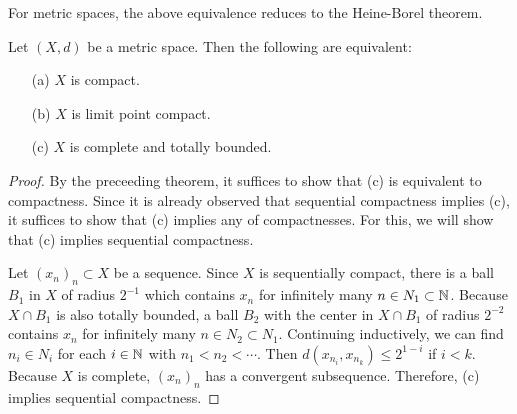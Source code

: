 For metric spaces, the above equivalence reduces to the Heine-Borel theorem.
\begin{thm}
    Let $(X, d)$ be a metric space.
    Then the following are equivalent:
    \begin{enumerate}
        \item[(a)]
        {
            $X$ is compact.
        }
        \item[(b)]
        {
            $X$ is limit point compact.
        }
        \item[(c)]
        {
            $X$ is complete and totally bounded.
        }
    \end{enumerate}
\end{thm}
\begin{proof}
    By the preceeding theorem, it suffices to show that (c) is equivalent to compactness.
    Since it is already observed that sequential compactness implies (c), it suffices to show that (c) implies any of compactnesses.
    For this, we will show that (c) implies sequential compactness.

    Let $(x_n)_n\subset X$ be a sequence.
    Since $X$ is sequentially compact, there is a ball $B_1$ in $X$ of radius $2^{-1}$ which contains $x_n$ for infinitely many $n\in N_1\subset{\mathbb{N}}$.
    Because $X\cap B_1$ is also totally bounded, a ball $B_2$ with the center in $X\cap B_1$ of radius $2^{-2}$ contains $x_n$ for infinitely many $n\in N_2\subset N_1$.
    Continuing inductively, we can find $n_i\in N_i$ for each $i\in{\mathbb{N}}$ with $n_1<n_2<\cdots$.
    Then $d(x_{n_i}, x_{n_k})\leq 2^{1-i}$ if $i<k$.
    Because $X$ is complete, $(x_n)_n$ has a convergent subsequence.
    Therefore, (c) implies sequential compactness.
\end{proof}

